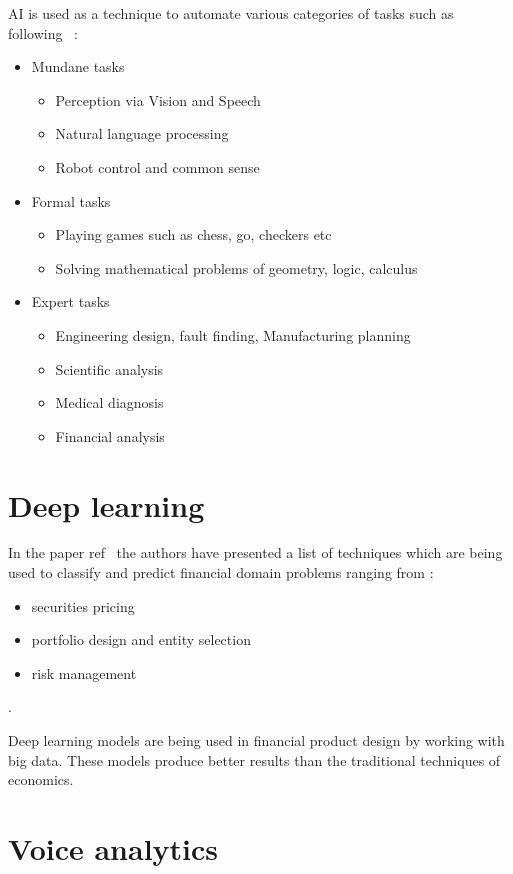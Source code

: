 AI is used as a technique to automate various categories of tasks such as following~ :
\begin{itemize}
	\item Mundane tasks
		\begin{itemize}
			\item Perception via Vision and Speech
			\item Natural language processing 
			\item Robot control and common sense
		\end{itemize}
	\item Formal tasks
	\begin{itemize}
		\item Playing games such as chess, go, checkers etc
		\item Solving mathematical problems of geometry, logic, calculus
	\end{itemize}
	\item Expert tasks
	\begin{itemize}
		\item Engineering design, fault finding, Manufacturing planning
		\item Scientific analysis
		\item Medical diagnosis
		\item Financial analysis
	\end{itemize}
\end{itemize}



\section{Deep learning}
In the paper ref~ the authors have presented a list of techniques which are being used to classify and predict financial domain problems ranging from :
\begin{itemize}
	\item securities pricing
	\item portfolio design and entity selection
	\item risk management
\end{itemize}.

Deep learning models are being used in financial product design by working with big data. These models produce better results than the traditional techniques of economics. 

\section{Voice analytics}



